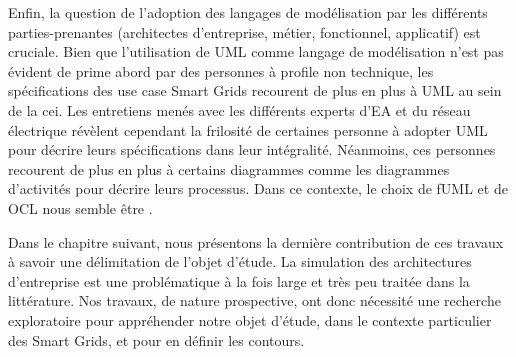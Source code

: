     Enfin, la question de l'adoption des langages de modélisation par les différents parties-prenantes (architectes
    d'entreprise, métier, fonctionnel, applicatif) est cruciale. Bien que l'utilisation de UML comme
    langage de modélisation n'est pas évident de prime abord par des personnes à profile non technique,
    les spécifications des use case Smart Grids recourent de plus en plus à UML au sein de la \gls{cei}.
    Les entretiens menés avec les différents experts d'EA et du réseau électrique révèlent cependant la frilosité
    de certaines personne à adopter UML pour décrire leurs spécifications dans leur intégralité. Néanmoins, ces
    personnes recourent de plus en plus à certains diagrammes comme les diagrammes d'activités pour décrire
    leurs processus. Dans ce contexte, le choix de fUML et de OCL nous semble être .

    Dans le chapitre suivant, nous présentons la dernière contribution de ces travaux à savoir
    une délimitation de l'objet d'étude. La simulation des architectures d'entreprise est une problématique à la
    fois large et très peu traitée dans la littérature. Nos travaux, de nature prospective, ont donc nécessité
    une recherche exploratoire pour appréhender notre objet d'étude, dans le contexte particulier des
    Smart Grids, et pour en définir les contours. 






